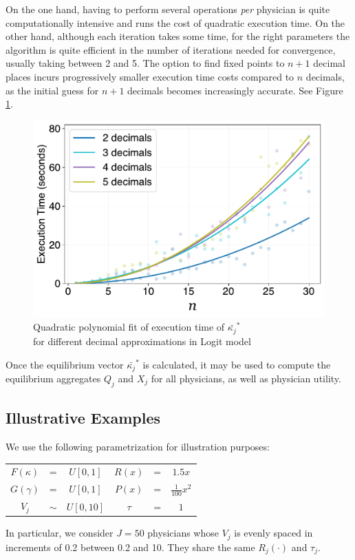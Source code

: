 \documentclass[../main.tex]{subfiles}
\begin{document}
On the one hand, having to perform several operations \textit{per} physician is quite computationally intensive and runs the cost of quadratic execution time. On the other hand, although each iteration takes some time, for the right parameters the algorithm is quite efficient in the number of iterations needed for convergence, usually taking between 2 and 5. The option to find fixed points to \( n + 1 \) decimal places incurs progressively smaller execution time costs compared to \( n \) decimals, as the initial guess for \( n + 1 \) decimals becomes increasingly accurate. See Figure \ref{fig:decimals}.

\begin{figure}[H]
\centering
\includegraphics[width=0.55\linewidth]{decimals.pdf}
\vspace{-0.25cm}
\captionsetup{justification=centerlast}
\caption{Quadratic polynomial fit of execution time of $\bar{\kappa_j}^*$ \\ for different decimal approximations in Logit model}
\label{fig:decimals}
\end{figure}

Once the equilibrium vector $\bar{\kappa_j}^*$ is calculated, it may be used to compute the equilibrium aggregates $Q_j$ and $X_j$ for all physicians, as well as physician utility.

\subsection{Illustrative Examples}
\label{sec:illustration}

We use the following parametrization for illustration purposes:
\begin{table}[H]
\centering
    \begin{tabular}{ccc|ccc}
        \toprule
            $F(\kappa)$ &=& $U[0,1]$ & $R(x)$ &=& $1.5x$\\
            $G(\gamma)$ &=& $U[0,1]$ & $P(x)$ &=& $\frac{1}{100}x^2$\\
            $V_j$ &$\sim$& $U[0,10]$ & $ \tau$ &=& $1$\\
        \bottomrule 
    \end{tabular}  
\end{table}
In particular, we consider $J = 50$ physicians whose $V_j$ is evenly spaced in increments of 0.2 between 0.2 and 10. They share the same $R_j(\cdot)$ and $\tau_j$.
\end{document}

